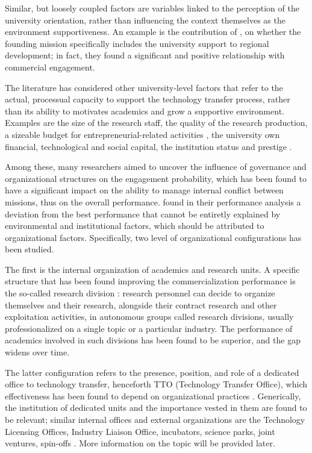 Similar, but loosely coupled factors are variables linked to the perception of the university orientation, rather than influencing the context themselves as the environment supportiveness. An example is the contribution of \citet{DEste2007}, on whether the founding mission specifically includes the university support to regional development; in fact, they found a significant and positive relationship with commercial engagement.

The literature has considered other university-level factors that refer to the actual, processual capacity to support the technology transfer process, rather than its ability to motivates academics and grow a supportive environment. Examples are the size of the research staff, the quality of the research production, a sizeable budget for entrepreneurial-related activities \citep{Colombo2010}, the university own financial, technological and social capital, the institution status and prestige \citep{Guerrero2014}.

Among these, many researchers aimed to uncover the influence of governance and organizational structures on the engagement probability, which has been found to have a significant impact on the ability to manage internal conflict between missions, thus on the overall performance. \citet{Siegel2003a} found in their performance analysis a deviation from the best performance that cannot be entiretly explained by environmental and institutional factors, which should be attributed to organizational factors. Specifically, two level of organizational configurations has been studied.

The first is the internal organization of academics and research units. A specific structure that has been found improving the commercialization performance is the so-called research division \citep{VanLooy2004}: research personnel can decide to organize themselves and their research, alongside their contract research and other exploitation activities, in autonomous groups called research divisions, usually professionalized on a single topic or a particular industry. The performance of academics involved in such divisions has been found to be superior, and the gap widens over time.

The latter configuration refers to the presence, position, and role of a dedicated office to technology transfer, henceforth TTO (Technology Transfer Office), which effectiveness has been found to depend on organizational practices \citep{Siegel2003a}. Generically, the institution of dedicated units and the importance vested in them are found to be relevant; similar internal offices and external organizations are the Technology Licensing Offices, Industry Liaison Office, incubators, science parks, joint ventures, spin-offs \citep{Tijssen2006}. More information on the topic will be provided later.

